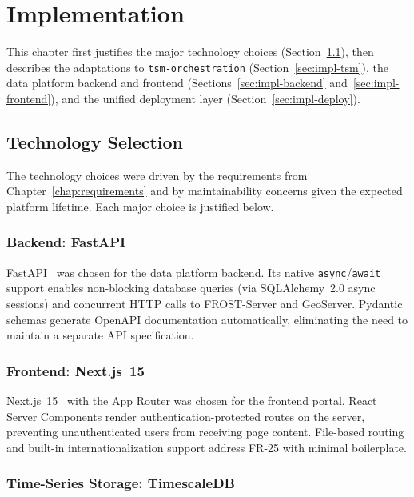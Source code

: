 \chapter{Implementation}
\label{chap:implementation}

This chapter first justifies the major technology choices
(Section~\ref{sec:impl-technology}), then describes the adaptations to
\texttt{tsm-orchestration} (Section~\ref{sec:impl-tsm}), the data platform
backend and frontend (Sections~\ref{sec:impl-backend} and~\ref{sec:impl-frontend}),
and the unified deployment layer (Section~\ref{sec:impl-deploy}).

\section{Technology Selection}
\label{sec:impl-technology}

The technology choices were driven by the requirements from Chapter~\ref{chap:requirements}
and by maintainability concerns given the expected platform lifetime. Each major choice
is justified below.

\subsection{Backend: FastAPI}
\label{sec:impl-tech-fastapi}

FastAPI~\cite{fastapi-ref} was chosen for the data platform backend. Its
native \texttt{async}/\texttt{await} support enables non-blocking database
queries (via SQLAlchemy~2.0 async sessions) and concurrent HTTP calls to FROST-Server and
GeoServer. Pydantic schemas generate OpenAPI documentation automatically, eliminating the
need to maintain a separate API specification.

\subsection{Frontend: Next.js~15}
\label{sec:impl-tech-nextjs}

Next.js~15~\cite{nextjs-ref} with the App Router was chosen for the frontend portal. React Server
Components render authentication-protected routes on the server, preventing unauthenticated
users from receiving page content. File-based routing and built-in internationalization
support address FR-25 with minimal boilerplate.

\subsection{Time-Series Storage: TimescaleDB}
\label{sec:impl-tech-timescaledb}

